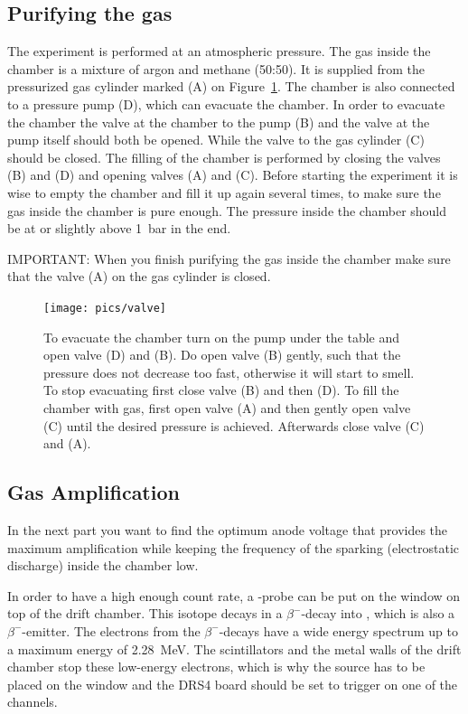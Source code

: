 \documentclass[12pt]{article}
\begin{document}
\subsection{Purifying the gas}
The experiment is performed at an atmospheric pressure. The gas inside the chamber is a mixture of argon and methane (50:50). It is supplied from the pressurized gas cylinder marked (A) on Figure~\ref{fig:gas}. The chamber is also connected to a pressure pump (D), which can evacuate the chamber. In order to evacuate the chamber the valve at the chamber to the pump (B) and the valve at the pump itself should both be opened. While the valve to the gas cylinder (C) should be closed. The filling of the chamber is performed by closing the valves (B) and (D) and opening valves (A) and (C). Before starting the experiment it is wise to empty the chamber and fill it up again several times, to make sure the gas inside the chamber is pure enough. The pressure inside the chamber should be at or slightly above \SI{1}{\bar} in the end.

IMPORTANT: When you finish purifying the gas inside the chamber make sure that the valve (A) on the gas cylinder is closed.

\begin{figure}[!h]
	\texttt{[image: pics/valve]}
	\centering
	\caption{To evacuate the chamber turn on the pump under the table and open valve (D) and (B). Do open valve (B) gently, such that the pressure does not decrease too fast, otherwise it will start to smell. To stop evacuating first close valve (B) and then (D). To fill the chamber with gas, first open valve (A) and then gently open valve (C) until the desired pressure is achieved. Afterwards close valve (C) and (A).}
	\label{fig:gas}
\end{figure}

\subsection{Gas Amplification}
In the next part you want to find the optimum anode voltage that provides the maximum amplification while keeping the frequency of the sparking (electrostatic discharge) inside the chamber low. 

In order to have a high enough count rate, a -probe can be put on the window on top of the drift chamber. This isotope decays in a $\beta^-$-decay into , which is also a $\beta^-$-emitter. The electrons from the $\beta^-$-decays have a wide energy spectrum up to a maximum energy of \SI{2.28}{\mega\electronvolt}. The scintillators and the metal walls of the drift chamber stop these low-energy electrons, which is why the source has to be placed on the window and the DRS4 board should be set to trigger on one of the channels.
\end{document}
